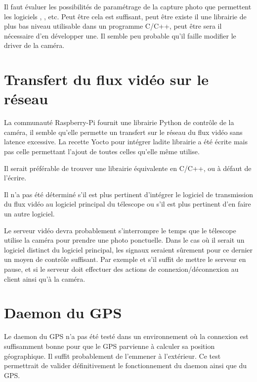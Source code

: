Il faut évaluer les possibilités de paramétrage de la capture photo que permettent les logiciels , , etc. Peut être cela est suffisant, peut être existe il une librairie de plus bas niveau utilisable dans un programme C/C++, peut être sera il nécessaire d'en développer une. Il semble peu probable qu'il faille modifier le driver de la caméra.

\section{Transfert du flux vidéo sur le réseau}

La communauté Raspberry-Pi fournit une librairie Python de contrôle de la caméra, il semble qu'elle permette un transfert sur le réseau du flux vidéo sans latence excessive. La recette Yocto pour intégrer ladite librairie a été écrite mais pas celle permettant l'ajout de toutes celles qu'elle même utilise.

Il serait préférable de trouver une librairie équivalente en C/C++, ou à défaut de l'écrire.

\vspace{1cm}

Il n'a pas été déterminé s'il est plus pertinent d'intégrer le logiciel de transmission du flux vidéo au logiciel principal du télescope ou s'il est plus pertinent d'en faire un autre logiciel.

Le serveur vidéo devra probablement s'interrompre le temps que le télescope utilise la caméra pour prendre une photo ponctuelle. Dans le cas où il serait un logiciel distinct du logiciel principal, les signaux seraient sûrement pour ce dernier un moyen de contrôle suffisant. Par exemple  et  s'il suffit de mettre le serveur en pause,  et  si le serveur doit effectuer des actions de connexion/déconnexion au client ainsi qu'à la caméra.

\section{Daemon du GPS}

Le daemon du GPS n'a pas été testé dans un environnement où la connexion est suffisamment bonne pour que le GPS parvienne à calculer sa position géographique. Il suffit probablement de l'emmener à l'extérieur. Ce test permettrait de valider définitivement le fonctionnement du daemon ainsi que du GPS.

